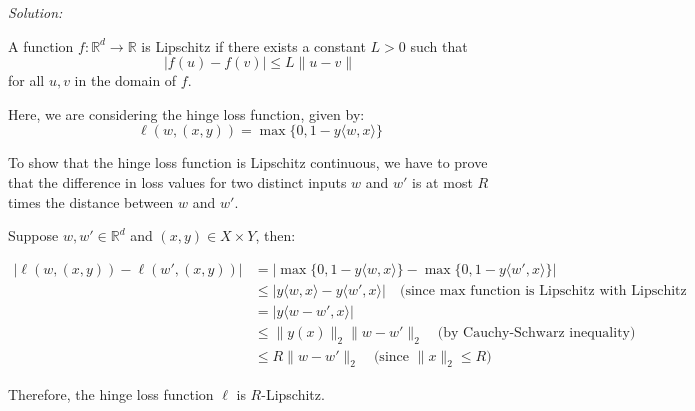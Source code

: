 \documentclass[
	10pt, %
	a4paper, %
	oneside, %
	headinclude,footinclude, %
	BCOR5mm, %
]{scrartcl}
\newenvironment{solution}
{\textit{Solution:}}
{}
\begin{document}
\begin{solution}

	A function $f: \mathbb{R}^d \rightarrow \mathbb{R}$ is Lipschitz if there exists a constant $L > 0$ such that
	\[|f(u) - f(v)| \leq L\|u - v\|\]
	for all $u, v$ in the domain of $f$.

	Here, we are considering the hinge loss function, given by:
	\[\ell(w, (x, y)) = \max\{0, 1 - y\langle w, x \rangle\}\]

	To show that the hinge loss function is Lipschitz continuous, we have to prove that the difference in loss values for two distinct inputs $w$ and $w'$ is at most $R$ times the distance between $w$ and $w'$.

	Suppose $w, w' \in \mathbb{R}^d$ and $(x, y) \in X \times Y$, then:

	\begin{align*}
		| \ell(w, (x, y)) - \ell(w', (x, y)) | & = | \max\{0, 1 - y\langle w, x \rangle\} - \max\{0, 1 - y\langle w', x \rangle\} |                                               \\
		                                       & \leq | y\langle w, x \rangle - y\langle w', x \rangle | \quad \text{(since max function is Lipschitz with Lipschitz constant 1)} \\
		                                       & = | y\langle w - w', x \rangle |                                                                                                 \\
		                                       & \leq \| y(x) \|_2 \| w - w' \|_2 \quad \text{(by Cauchy-Schwarz inequality)}                                                     \\
		                                       & \leq R \| w - w' \|_2 \quad \text{(since } \| x \|_2 \leq R \text{)}
	\end{align*}

	Therefore, the hinge loss function $\ell$ is $R$-Lipschitz.
\end{solution}


\end{document}
